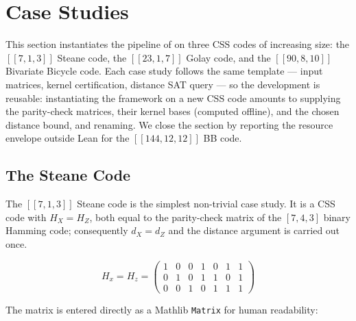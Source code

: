 \section{Case Studies}\label{sec:casestudies}

%

This section instantiates the pipeline of  on three CSS codes of
increasing size: the $[[7,1,3]]$ Steane code, the $[[23,1,7]]$ Golay code, and
the $[[90,8,10]]$ Bivariate Bicycle code. Each case study follows the same
template --- input matrices, kernel certification, distance SAT query --- so the
development is reusable: instantiating the framework on a new CSS code amounts
to supplying the parity-check matrices, their kernel bases (computed offline),
and the chosen distance bound, and renaming. We close the section by reporting
the resource envelope outside Lean for the $[[144, 12, 12]]$ BB code.

\subsection{The Steane Code}

%

The $[[7,1,3]]$ Steane code is the simplest non-trivial case study. It is a CSS
code with $H_X = H_Z$, both equal to the parity-check matrix of the $[7,4,3]$
binary Hamming code; consequently $d_X = d_Z$ and the distance argument is
carried out once.

$$H_x = H_z = \begin{pmatrix}
    1 & 0 & 0 & 1 & 0 & 1 & 1 \\ 
    0 & 1 & 0 & 1 & 1 & 0 & 1 \\
    0 & 0 & 1 & 0 & 1 & 1 & 1
\end{pmatrix}$$

%

The matrix is entered directly as a Mathlib \lstinline{Matrix} for human
readability:

